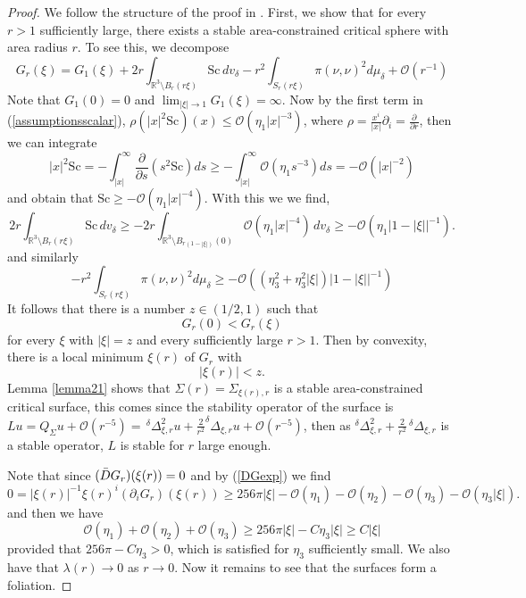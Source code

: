 \documentclass[12pt,a4paper]{amsart}
\theoremstyle{plain}
\theoremstyle{definition}
\begin{document}
\begin{proof}
  We follow the structure of the  proof in \cite{eichko}.  First, we show that for every \(r > 1\) sufficiently large, there exists a stable
area-constrained critical sphere with area radius \(r\).
To see this, we decompose
\[
G_r(\xi) = G_1(\xi) + 2 r \int_{\mathbb{R}^3 \setminus B_r(r \xi)} \mathrm{Sc} \, d{v}_\delta -r^2 \int_{S_r(r \xi)} \pi(\nu,\nu)^2 d\mu_\delta  + \mathcal{O} (r^{-1})
\]
 Note that \(G_1(0) = 0\) and \(\lim_{|\xi| \to 1} G_1(\xi) = \infty\).  Now by the first term in (\ref{assumptionsscalar}),    $\rho (| x|^2 \mathrm{Sc})(x) \leq  \mathcal{O}( \eta_1| x|^{-3})$, where $\rho= \frac{x^i}{|x|}\partial_i= \frac{\partial}{\partial r}$,  then we can integrate 
\begin{equation}\label{estilow}
    |x|^2 \mathrm{Sc} = - \int_{|x|}^\infty  \frac{\partial}{\partial s} (s^2 \mathrm{Sc}) ds \geq - \int_{|x|}^\infty  \mathcal{O}(\eta_1 s^{-3})  ds = -\mathcal{O}(|x|^{-2})
    \end{equation}
 and obtain that $ \mathrm{Sc} \geq -\mathcal{O}(\eta_1|x|^{-4}) $. With this we  we find,
\[
2 r \int_{\mathbb{R}^3 \setminus B_r(r \xi)} \mathrm{Sc} \, dv_\delta \geq -2 r \int_{\mathbb{R}^3 \setminus B_{r(1 - |\xi|)}(0)} \mathcal{O}(\eta_1|x|^{-4})  \, dv_\delta \geq -\mathcal{O}(\eta_1 |1 - |\xi||^{-1}).
\]
and similarly 
\begin{equation}
    -r^2 \int_{S_r(r \xi)} \pi(\nu,\nu)^2 d\mu_\delta  \geq -\mathcal{O}((\eta_3^2 +\eta_3^2|\xi| ) |1 - |\xi||^{-1})
\end{equation}
It follows that there is a number \(z \in (1/2, 1)\) such that
\[
G_r(0) < G_r(\xi)
\]
for every \(\xi\) with \(|\xi| = z\) and every sufficiently large \(r > 1\). Then by convexity, there is a local minimum
\(\xi(r)\) of \(G_r\) with
\[
|\xi(r)| < z.
\]
Lemma \ref{lemma21} shows that \(\Sigma(r) = \Sigma_{\xi(r), r}\) is a stable area-constrained critical surface, this comes since the stability operator of the surface is $Lu = Q_\Sigma u + \mathcal{O}(r^{-5})=  \,^\delta\Delta^2_{\xi,r} u+\frac{2}{r^2} ^\delta \Delta_{\xi,r} u + \mathcal{O}(r^{-5}) $, then as $^\delta\Delta^2_{\xi,r} +\frac{2}{r^2}\, ^\delta \Delta_{\xi,r}$ is a stable operator, $L$ is stable for $r$ large enough.

Note that since  \((\Bar{D} G_r)(\xi(r)) = 0\) and by  (\ref{DGexp}) we find
\[
0 = |\xi(r)|^{-1}  \xi(r)^i (\partial_i G_r)(\xi(r)) \geq    256 \pi |\xi| -\mathcal{O}(\eta_1) -\mathcal{O}(\eta_2) -\mathcal{O}(\eta_3) - \mathcal{O}(\eta_3|\xi|).
\]
and then we have 
\begin{equation}\label{estixi}
    \mathcal{O}(\eta_1)+ \mathcal{O}(\eta_2)+ \mathcal{O}( \eta_3) \geq 256 \pi |\xi| -C\eta_3|\xi| \geq C |\xi|
\end{equation}
provided that $256 \pi  -C\eta_3 >0 $, which is satisfied for $\eta_3$ sufficiently small.   We also have that $\lambda (r)\to 0$ as $r \to 0$. Now it remains to see that the surfaces form a foliation.


\end{proof}
\end{document}
